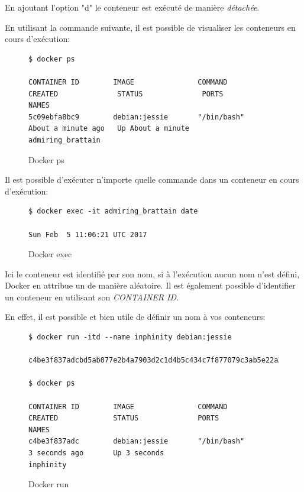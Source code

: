En ajoutant l'option "d" le conteneur est exécuté de manière \emph{détachée}.

En utilisant la commande suivante, il est possible de visualiser les conteneurs en cours d'exécution:

\begin{figure}[H] 
\centering 
\begin{lstlisting}[frame=single]
$ docker ps

CONTAINER ID        IMAGE               COMMAND             CREATED              STATUS              PORTS               NAMES
5c09ebfa8bc9        debian:jessie       "/bin/bash"         About a minute ago   Up About a minute                       admiring_brattain
\end{lstlisting}
\caption[Docker ps]{Docker ps}
\label{fig:dockerPs} 
\end{figure}

Il est possible d'exécuter n’importe quelle commande dans un conteneur en cours d'exécution:

\begin{figure}[H] 
\centering 
\begin{lstlisting}[frame=single]
$ docker exec -it admiring_brattain date

Sun Feb  5 11:06:21 UTC 2017
\end{lstlisting}
\caption[Docker exec]{Docker exec}
\label{fig:dockerExec} 
\end{figure}

Ici le conteneur est identifié par son nom, si à l'exécution aucun nom n'est défini, Docker en attribue un de manière aléatoire. Il est également possible d'identifier un conteneur en utilisant son \emph{CONTAINER ID}.

En effet, il est possible et bien utile de définir un nom à vos conteneurs:

\begin{figure}[H] 
\centering 
\begin{lstlisting}[frame=single]
$ docker run -itd --name inphinity debian:jessie

c4be3f837adcbd5ab077e2b4a7903d2c1d4b5c434c7f877079c3ab5e22a2c555

$ docker ps

CONTAINER ID        IMAGE               COMMAND             CREATED             STATUS              PORTS               NAMES
c4be3f837adc        debian:jessie       "/bin/bash"         3 seconds ago       Up 3 seconds                            inphinity
\end{lstlisting}
\caption[Docker run]{Docker run}
\label{fig:dockerRun} 
\end{figure}

